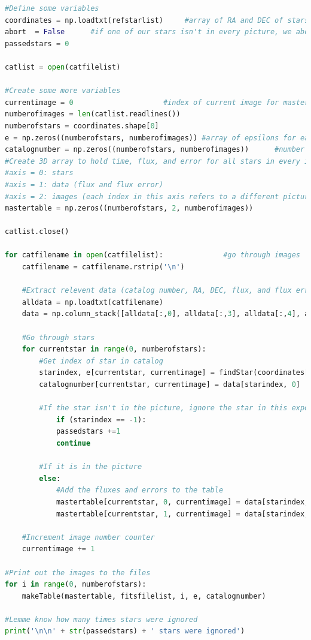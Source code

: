 \documentclass{aastex61}
\begin{document}
\begin{lstlisting}[language = Python, caption = Outputs the flux and its error for each star in every exposure as well as the time for each image (YM)]
#Define some variables
coordinates = np.loadtxt(refstarlist)     #array of RA and DEC of stars
abort  = False      #if one of our stars isn't in every picture, we abort code to replace it
passedstars = 0

catlist = open(catfilelist)

#Create some more variables
currentimage = 0                     #index of current image for mastertable
numberofimages = len(catlist.readlines())
numberofstars = coordinates.shape[0]
e = np.zeros((numberofstars, numberofimages)) #array of epsilons for each star in each exposure
catalognumber = np.zeros((numberofstars, numberofimages))      #number in the catalog
#Create 3D array to hold time, flux, and error for all stars in every image
#axis = 0: stars
#axis = 1: data (flux and flux error)
#axis = 2: images (each index in this axis refers to a different picture)
mastertable = np.zeros((numberofstars, 2, numberofimages))

catlist.close()

for catfilename in open(catfilelist):              #go through images
	catfilename = catfilename.rstrip('\n')
	
	#Extract relevent data (catalog number, RA, DEC, flux, and flux error)
	alldata = np.loadtxt(catfilename)
	data = np.column_stack([alldata[:,0], alldata[:,3], alldata[:,4], alldata[:,5], alldata[:,6]])
	
	#Go through stars
	for currentstar in range(0, numberofstars):  
		#Get index of star in catalog  
		starindex, e[currentstar, currentimage] = findStar(coordinates[currentstar, :], data) 
		catalognumber[currentstar, currentimage] = data[starindex, 0] 	
		
		#If the star isn't in the picture, ignore the star in this exposure
			if (starindex == -1):
			passedstars +=1
			continue
	
		#If it is in the picture
		else:
			#Add the fluxes and errors to the table                   
			mastertable[currentstar, 0, currentimage] = data[starindex,3]
			mastertable[currentstar, 1, currentimage] = data[starindex,4]

	#Increment image number counter
	currentimage += 1

#Print out the images to the files
for i in range(0, numberofstars):
	makeTable(mastertable, fitsfilelist, i, e, catalognumber)

#Lemme know how many times stars were ignored
print('\n\n' + str(passedstars) + ' stars were ignored')
\end{lstlisting}
\end{document}
